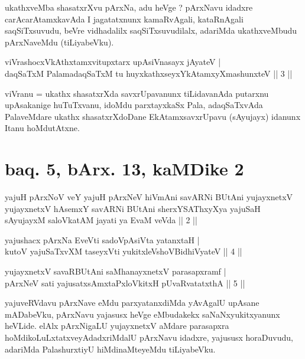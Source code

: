 \begin{artha}
ukathxveMba shasatxrXvu pArxNa, adu heVge ? pArxNavu idadxre carAcarAtamxkavAda I jagatatxnunx kamaRvAgali, kataRnAgali saqSiTxsuvudu, beVre vidhadalilx saqSiTxsuvudilalx, adariMda ukathxveMbudu pArxNaveMdu (tiLiyabeVku).
\end{artha}

\begin{shl}
viVrashocxVkAthxtamxvitupxtarx upAsiVnasayx jAyateV | \\
daqSaTxM PalamadaqSaTxM tu huyxkathxseyxYkAtamxyXmashunxteV \hfill ||  3 || 
\end{shl}

\begin{artha}
viVranu = ukathx shasatxrXda savxrUpavanunx tiLidavanAda putarxnu upAsakanige huTuTxvanu, idoMdu parxtayxkaSx Pala, adaqSaTxvAda PalaveMdare ukathx shasatxrXdoDane EkAtamxsavxrUpavu (sAyujayx) idanunx Itanu hoMdutAtxne.
\end{artha}

\section*{baq. 5, bArx. 13, kaMDike 2}

\begin{shl}
yajuH pArxNoV veY yajuH pArxNeV hiVmAni savARNi BUtAni yujayxnetxV yujayxnetxV hAsemxY savARNi BUtAni sherxYSAThxyXya yajuSaH sAyujayxM saloVkatAM jayati ya EvaM veVda || 2 ||
\end{shl}


\begin{shl}
yajushacx pArxNa EveVti sadoVpAsiVta yatanxtaH | \\
kutoV yajuSaTxvXM taseyxVti yukitxleVshoV\s BidhiVyateV \hfill ||  4 || 
\end{shl}

\begin{shl}
yujayxnetxV savaRBUtAni saMhanayxnetxV parasapxramf | \\
pArxNeV sati yajusatxsAmxtaPxloVkitxH pUvaRvatatxthA \hfill ||  5 || 
\end{shl}

\begin{artha}
yajuveRVdavu pArxNave eMdu parxyatanxdiMda yAvAgalU upAsane mADabeVku, pArxNavu yajasusx heVge eMbudakekx saNaNxyukitxyanunx heVLide. elAlx pArxNigaLU yujayxnetxV aMdare parasapxra hoMdikoLuLxtatxveyAdadxriMdalU pArxNavu idadxre, yajususx horaDuvudu, adariMda PalashurxtiyU hiMdinaMteyeMdu tiLiyabeVku.
\end{artha}

